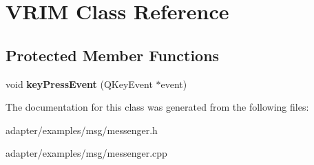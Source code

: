 \hypertarget{classVRIM}{
\section{VRIM Class Reference}
\label{classVRIM}
}
\subsection*{Protected Member Functions}
\begin{DoxyCompactItemize}
\item 
\hypertarget{classVRIM_ab549bdd271106b6687abe4fee0bfda59}{
void {\bfseries keyPressEvent} (QKeyEvent $\ast$event)}
\label{classVRIM_ab549bdd271106b6687abe4fee0bfda59}

\end{DoxyCompactItemize}


The documentation for this class was generated from the following files:\begin{DoxyCompactItemize}
\item 
adapter/examples/msg/messenger.h\item 
adapter/examples/msg/messenger.cpp\end{DoxyCompactItemize}
